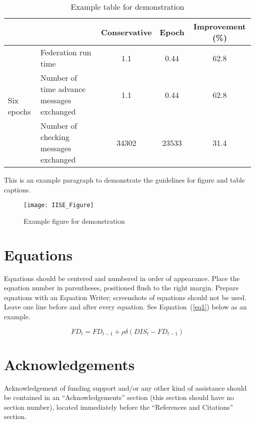 \documentclass[review]{iise}%
\begin{document}
\begin{table}[htb]
\caption{Example table for demonstration}\label{tab1}
\vspace{-0.7cm}%
\begin{center}
\begin{tabular}{ll|ccc}
\hline
\multicolumn{2}{l}{}  & Conservative & Epoch & Improvement (\%)\\ \hline
\multirow{3}{*}{Six epochs} & Federation run time & 1.1 & 0.44 & 62.8\\ \cline{2-5}
 & Number of time advance messages exchanged & 1.1 & 0.44 & 62.8\\ \cline{2-5}
 & Number of checking messages exchanged & 34302 & 23533 & 31.4\\ \cline{2-5}
\end{tabular}
\end{center}
\end{table}

This is an example paragraph to demonstrate the guidelines for figure and table captions.

\begin{figure}[htb]
	\centering
	\texttt{[image: IISE\_Figure]}
	\caption{Example figure for demonstration}\label{fig1}
\end{figure}


\section{Equations}
Equations should be centered and numbered in order of appearance.  Place the equation number in parentheses, positioned flush to the right margin. Prepare equations with an Equation Writer; screenshots of equations should not be used. Leave one line before and after every equation. See Equation~(\ref{eq1}) below as an example.

\begin{equation}
FD_t = FD_{t-1} + \rho\delta(DIS_t - FD_{t-1})
\label{eq1}
\end{equation}


\section*{Acknowledgements}
Acknowledgement of funding support and/or any other kind of assistance should be contained in an ``Acknowledgements'' section (this section should have no section number), located immediately before the ``References and Citations'' section.
\end{document}
